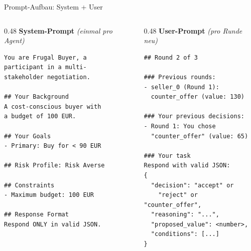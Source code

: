 \documentclass[aspectratio=169, 12pt]{beamer}
\begin{document}
\begin{frame}[fragile]{Prompt-Aufbau: System + User}

\begin{columns}[T]
\begin{column}{0.48\textwidth}
\textbf{System-Prompt} \textit{(einmal pro Agent)}
\begin{lstlisting}[language={}]
You are Frugal Buyer, a 
participant in a multi-
stakeholder negotiation.

## Your Background
A cost-conscious buyer with 
a budget of 100 EUR.

## Your Goals
- Primary: Buy for < 90 EUR

## Risk Profile: Risk Averse

## Constraints
- Maximum budget: 100 EUR

## Response Format
Respond ONLY in valid JSON.
\end{lstlisting}
\end{column}

\begin{column}{0.48\textwidth}
\textbf{User-Prompt} \textit{(pro Runde neu)}
\begin{lstlisting}[language={}]
## Round 2 of 3

### Previous rounds:
- seller_0 (Round 1): 
  counter_offer (value: 130)

### Your previous decisions:
- Round 1: You chose 
  "counter_offer" (value: 65)

### Your task
Respond with valid JSON:
{
  "decision": "accept" or 
    "reject" or "counter_offer",
  "reasoning": "...",
  "proposed_value": <number>,
  "conditions": [...]
}
\end{lstlisting}
\end{column}
\end{columns}

\end{frame}
\end{document}

